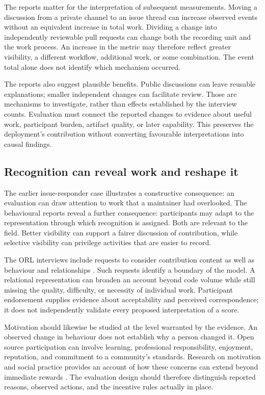 The reports matter for the interpretation of subsequent measurements. Moving a discussion from a private channel to an issue thread can increase observed events without an equivalent increase in total work. Dividing a change into independently reviewable pull requests can change both the recording unit and the work process. An increase in the metric may therefore reflect greater visibility, a different workflow, additional work, or some combination. The event total alone does not identify which mechanism occurred.

The reports also suggest plausible benefits. Public discussions can leave reusable explanations; smaller independent changes can facilitate review. Those are mechanisms to investigate, rather than effects established by the interview counts. Evaluation must connect the reported changes to evidence about useful work, participant burden, artifact quality, or later capability. This preserves the deployment's contribution without converting favourable interpretations into causal findings.

\subsection{Recognition can reveal work and reshape it}
The earlier issue-responder case illustrates a constructive consequence: an evaluation can draw attention to work that a maintainer had overlooked. The behavioural reports reveal a further consequence: participants may adapt to the representation through which recognition is assigned. Both are relevant to the field. Better visibility can support a fairer discussion of contribution, while selective visibility can privilege activities that are easier to record.

The ORL interviews include requests to consider contribution content as well as behaviour and relationships \citep{zhao2024}. Such requests identify a boundary of the model. A relational representation can broaden an account beyond code volume while still missing the quality, difficulty, or necessity of individual work. Participant endorsement supplies evidence about acceptability and perceived correspondence; it does not independently validate every proposed interpretation of a score.

Motivation should likewise be studied at the level warranted by the evidence. An observed change in behaviour does not establish why a person changed it. Open source participation can involve learning, professional responsibility, enjoyment, reputation, and commitment to a community's standards. Research on motivation and social practice provides an account of how these concerns can extend beyond immediate rewards \citep{vonkrogh2012}. The evaluation design should therefore distinguish reported reasons, observed actions, and the incentive rules actually in place.

